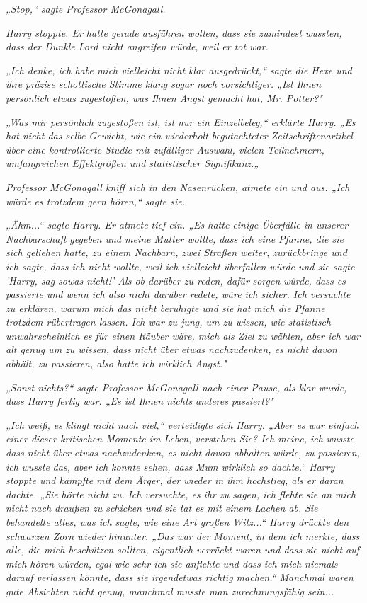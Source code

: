 {\emph{„Stop,“ sagte Professor McGonagall.}

\emph{Harry stoppte. Er hatte gerade ausführen wollen, dass sie zumindest wussten, dass der Dunkle Lord nicht angreifen würde, weil er tot war.}

\emph{„Ich denke, ich habe mich vielleicht nicht klar ausgedrückt,“ sagte die Hexe und ihre präzise schottische Stimme klang sogar noch vorsichtiger. „Ist} \emph{\emph{Ihnen persönlich}} \emph{etwas zugestoßen, was Ihnen Angst gemacht hat, Mr. Potter?"}

\emph{„Was mir persönlich zugestoßen ist, ist nur ein Einzelbeleg,“ erklärte Harry. „Es hat nicht das selbe Gewicht, wie ein wiederholt begutachteter Zeitschriftenartikel über eine kontrollierte Studie mit zufälliger Auswahl, vielen Teilnehmern, umfangreichen Effektgrößen und statistischer Signifikanz.„}

\emph{Professor McGonagall kniff sich in den Nasenrücken, atmete ein und aus. „Ich würde es trotzdem gern hören,“ sagte sie.}

\emph{„Ähm...“ sagte Harry. Er atmete tief ein. „Es hatte einige Überfälle in unserer Nachbarschaft gegeben und meine Mutter wollte, dass ich eine Pfanne, die sie sich geliehen hatte, zu einem Nachbarn, zwei Straßen weiter, zurückbringe und ich sagte, dass ich nicht wollte, weil ich vielleicht überfallen würde und sie sagte 'Harry, sag sowas nicht!' Als ob darüber zu reden, dafür} \emph{\emph{sorgen}} \emph{würde, dass es passierte und wenn ich also nicht darüber redete, wäre ich sicher. Ich versuchte zu erklären, warum mich das nicht beruhigte und sie hat mich die Pfanne trotzdem rübertragen lassen. Ich war zu jung, um zu wissen, wie statistisch unwahrscheinlich es für einen Räuber wäre, mich als Ziel zu wählen, aber ich war alt genug um zu wissen, dass nicht über etwas nachzudenken, es nicht davon abhält, zu passieren, also hatte ich wirklich Angst."}

\emph{„Sonst nichts?“ sagte Professor McGonagall nach einer Pause, als klar wurde, dass Harry fertig war. „Es ist Ihnen nichts} \emph{\emph{anderes}} \emph{passiert?"}

\emph{„Ich weiß, es} \emph{\emph{klingt}} \emph{nicht nach viel,“ verteidigte sich Harry. „Aber es war einfach einer dieser kritischen Momente im Leben, verstehen Sie? Ich meine, ich} \emph{\emph{wusste}, dass nicht über etwas nachzudenken, es nicht davon abhalten würde, zu passieren, ich} \emph{\emph{wusste}} \emph{das, aber ich konnte sehen, dass} \emph{Mum wirklich so dachte.“ Harry stoppte und kämpfte mit dem Ärger, der wieder in ihm hochstieg, als er daran dachte. „Sie} \emph{\emph{hörte nicht zu.}} \emph{Ich versuchte, es ihr zu sagen, ich} \emph{\emph{flehte sie an}} \emph{mich nicht nach draußen zu schicken und sie} \emph{\emph{tat es mit einem Lachen ab.}} \emph{Sie behandelte alles, was ich sagte, wie eine Art großen Witz...“ Harry drückte den schwarzen Zorn wieder hinunter. „Das war der Moment, in dem ich merkte, dass alle, die mich beschützen sollten, eigentlich verrückt waren und dass sie nicht auf mich hören würden, egal wie sehr ich sie anflehte und dass ich mich niemals darauf verlassen könnte, dass sie irgendetwas richtig machen.“ Manchmal waren gute Absichten nicht genug, manchmal musste man zurechnungsfähig sein...}

}
